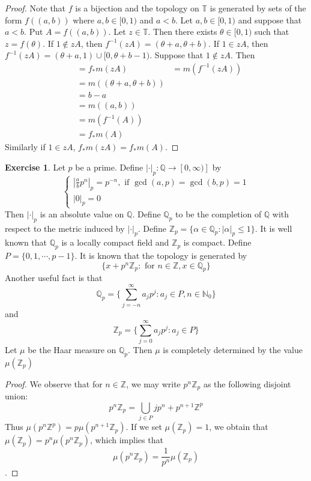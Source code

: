 \documentclass[12pt]{amsart}
\theoremstyle{definition}
\newtheorem{ex}[definition]{Exercise}
\newcommand{\al}{\alpha}
\newcommand{\N}{\mathbb{N}}
\newcommand{\Z}{\mathbb{Z}}
\newcommand{\T}{\mathbb{T}}
\newcommand{\Q}{\mathbb{Q}}
\begin{document}
	\begin{proof}
		Note that $f$ is a bijection and the topology on $\T$ is generated by sets of the form $f((a, b))$ where $a,b \in [0,1)$ and $a< b$. Let $a,b \in [ 0,1 )$ and suppose that $a<b$. Put $A = f((a, b))$. Let $z \in \T$. Then there exists $\theta \in [0, 1)$ such that $z = f(\theta)$. If $1 \not \in zA$, then $f^{-1}(zA) = (\theta + a, \theta + b)$. If $1 \in zA$, then $f^{-1}(zA) = (\theta + a , 1) \cup [0,  \theta + b - 1)$. Suppose that $1 \not \in zA$. Then
		\begin{align*}
			& = f_*m(zA) 
			& = m(f^{-1}(zA)) \\
			& = m((\theta + a, \theta + b)) \\
			& = b - a \\
			& = m((a,b)) \\
			& = m(f^{-1}(A)) \\
			& = f_*m(A)
		\end{align*}
	Similarly if $1 \in zA$, $f_*m(zA) = f_*m(A)$.
	\end{proof} 

	\begin{ex}
		Let $p$ be a prime. Define $|\cdot |_p: \Q \rightarrow [0, \infty)]$ by 
		\[
		\begin{cases}
			|\frac{a}{b}p^n|_p = p^{-n}, \text{ if } \gcd(a,p) = \gcd(b,p) = 1 \\
			|0|_p = 0
		\end{cases}
		\]
		Then $|\cdot|_p$ is an absolute value on $\Q$. Define $\Q_p$ to be the completion of $\Q$ with respect to the metric induced by $|\cdot|_p$. Define $\Z_p = \{\al \in \Q_p: |\al|_p \leq 1 \}$. It is well known that $\Q_p$ is a locally compact field and $\Z_p$ is compact. Define $P = \{0, 1, \cdots, p-1\}$. It is known that the topology is generated by  $$\{x + p^n\Z_p: \text{ for } n \in \Z, x \in \Q_p\}$$ Another useful fact is that $$\Q_p = \{\sum_{j = -n}^{\infty} a_jp^j : a_j \in P, n \in \N_0\}$$ and $$\Z_p = \{\sum_{j = 0}^{\infty} a_jp^j : a_j \in P\}$$ 
		Let $\mu$ be the Haar measure on $\Q_p$. Then $\mu$ is completely determined by the value $\mu(\Z_p)$  
	\end{ex}

	\begin{proof}
		We observe that for $n \in \Z$, we may write $p^n \Z_p$ as the following disjoint union: $$p^n\Z_p = \bigcup\limits_{j \in P} jp^n + p^{n+1}\Z^p$$ Thus $\mu(p^n \Z^{p}) = p \mu(p^{n+1}\Z_p)$. If we set $\mu(\Z_p) = 1$, we obtain that $\mu(\Z_p) = p^n \mu(p^n\Z_p)$, which implies that $$\mu(p^n \Z_p) = \frac{1}{p^n}\mu(\Z_p)$$.  
	\end{proof}
	
\end{document}
